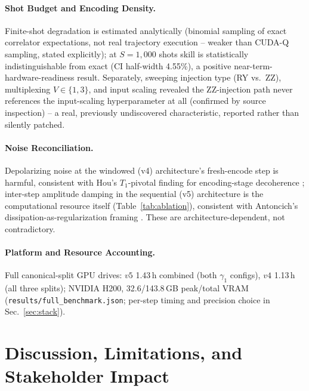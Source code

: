 \documentclass[11pt]{article}
\begin{document}
\paragraph{Shot Budget and Encoding Density.}
Finite-shot degradation is estimated analytically (binomial sampling of exact correlator
expectations, not real trajectory execution -- weaker than CUDA-Q sampling, stated explicitly);
at $S{=}1{,}000$ shots skill is statistically indistinguishable from exact (CI half-width 4.55\%),
a positive near-term-hardware-readiness result. Separately, sweeping injection type (RY vs.\ ZZ),
multiplexing $V\in\{1,3\}$, and input scaling revealed the ZZ-injection path never references the
input-scaling hyperparameter at all (confirmed by source inspection) -- a real, previously
undiscovered characteristic, reported rather than silently patched.

\paragraph{Noise Reconciliation.}
Depolarizing noise at the windowed (v4) architecture's fresh-encode step is harmful, consistent
with Hou's $T_1$-pivotal finding for encoding-stage decoherence \cite{hou}; inter-step amplitude
damping in the sequential (v5) architecture is the computational resource itself
(Table~\ref{tab:ablation}), consistent with Antoncich's dissipation-as-regularization framing
\cite{antoncich}. These are architecture-dependent, not contradictory.

\paragraph{Platform and Resource Accounting.}
Full canonical-split GPU drives: $v5$ 1.43\,h combined (both $\gamma_1$ configs), $v4$ 1.13\,h
(all three splits); NVIDIA H200, 32.6/143.8\,GB peak/total VRAM (\texttt{results/full\_benchmark.json};
per-step timing and precision choice in Sec.~\ref{sec:stack}).

\section{Discussion, Limitations, and Stakeholder Impact}
\end{document}

